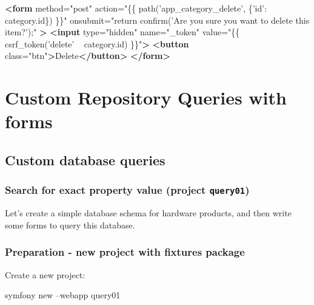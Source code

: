 \documentclass[a4paperpaper,openright]{book}
\newenvironment{Shaded}{}{}
\newcommand{\ExtensionTok}[1]{#1}
\newcommand{\KeywordTok}[1]{\textcolor[rgb]{0.00,0.44,0.13}{\textbf{#1}}}
\newcommand{\NormalTok}[1]{#1}
\newcommand{\OtherTok}[1]{\textcolor[rgb]{0.00,0.44,0.13}{#1}}
\newcommand{\StringTok}[1]{\textcolor[rgb]{0.25,0.44,0.63}{#1}}
\begin{document}
\begin{Shaded}
\begin{Highlighting}[]
    \KeywordTok{<form}
\OtherTok{        method=}\StringTok{"post"}
\OtherTok{        action=}\StringTok{"\{\{ path('app_category_delete', \{'id': category.id\}) \}\}"}
\OtherTok{        onsubmit=}\StringTok{"return confirm('Are you sure you want to delete this item?');"}
    \KeywordTok{>}
        \KeywordTok{<input}\OtherTok{ type=}\StringTok{"hidden"}\OtherTok{ name=}\StringTok{"_token"}\OtherTok{ value=}\StringTok{"\{\{ csrf_token('delete' ~ category.id) \}\}"}\KeywordTok{>}
        \KeywordTok{<button}\OtherTok{ class=}\StringTok{"btn"}\KeywordTok{>}\NormalTok{Delete}\KeywordTok{</button>}
    \KeywordTok{</form>}
\end{Highlighting}
\end{Shaded}

\part{Custom Repository Queries with forms}

\hypertarget{custom-database-queries}{%
\chapter{Custom database queries}\label{custom-database-queries}}

\hypertarget{search-for-exact-property-value-project-query01}{%
\section{\texorpdfstring{Search for exact property value (project
\texttt{query01})}{Search for exact property value (project query01)}}\label{search-for-exact-property-value-project-query01}}

Let's create a simple database schema for hardware products, and then
write some forms to query this database.

\hypertarget{preparation---new-project-with-fixtures-package-1}{%
\section{Preparation - new project with fixtures
package}\label{preparation---new-project-with-fixtures-package-1}}

Create a new project:

\begin{Shaded}
\begin{Highlighting}[]
     \ExtensionTok{symfony}\NormalTok{ new --webapp query01}
\end{Highlighting}
\end{Shaded}
\end{document}
